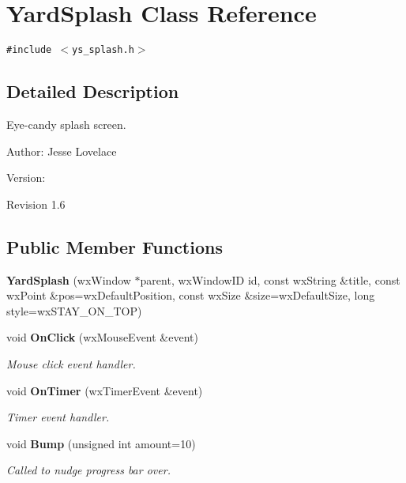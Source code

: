\section{Yard\-Splash Class Reference}
\label{classYardSplash}
{\tt \#include $<$ys\_\-splash.h$>$}



\subsection{Detailed Description}
Eye-candy splash screen. 

\begin{Desc}
\item[Author:]Jesse Lovelace \end{Desc}
\begin{Desc}
\item[Version:]\begin{Desc}
\item[Revision]1.6 \end{Desc}
\end{Desc}


\subsection*{Public Member Functions}
\begin{CompactItemize}
\item 
{\bf Yard\-Splash} (wx\-Window $\ast$parent, wx\-Window\-ID id, const wx\-String \&title, const wx\-Point \&pos=wx\-Default\-Position, const wx\-Size \&size=wx\-Default\-Size, long style=wx\-STAY\_\-ON\_\-TOP)\label{classYardSplash_a0}

\item 
void {\bf On\-Click} (wx\-Mouse\-Event \&event)
\begin{CompactList}\small\item\em Mouse click event handler. \item\end{CompactList}\item 
void {\bf On\-Timer} (wx\-Timer\-Event \&event)\label{classYardSplash_a3}

\begin{CompactList}\small\item\em Timer event handler. \item\end{CompactList}\item 
void {\bf Bump} (unsigned int amount=10)
\begin{CompactList}\small\item\em Called to nudge progress bar over. \item\end{CompactList}\end{CompactItemize}


